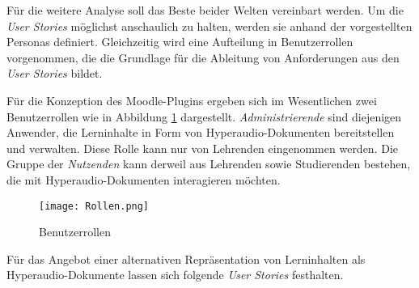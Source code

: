 Für die weitere Analyse soll das Beste beider Welten vereinbart werden. Um die \textit{User Stories} möglichst anschaulich zu halten, werden sie anhand der vorgestellten Personas definiert. Gleichzeitig wird eine Aufteilung in Benutzerrollen vorgenommen, die die Grundlage für die Ableitung von Anforderungen aus den \textit{User Stories} bildet.

Für die Konzeption des Moodle-Plugins ergeben sich im Wesentlichen zwei Benutzerrollen wie in Abbildung \ref{fig:Rollen} dargestellt. \textit{Administrierende} sind diejenigen Anwender, die Lerninhalte in Form von Hyperaudio-Dokumenten bereitstellen und verwalten. Diese Rolle kann nur von Lehrenden eingenommen werden. Die Gruppe der \textit{Nutzenden} kann derweil aus Lehrenden sowie Studierenden bestehen, die mit Hyperaudio-Dokumenten interagieren möchten.

\begin{figure}[h!]
\texttt{[image: Rollen.png]}
\caption{\label{fig:Rollen}Benutzerrollen}
\end{figure}


Für das Angebot einer alternativen Repräsentation von Lerninhalten als Hyperaudio-Dokumente lassen sich folgende \textit{User Stories} festhalten.



